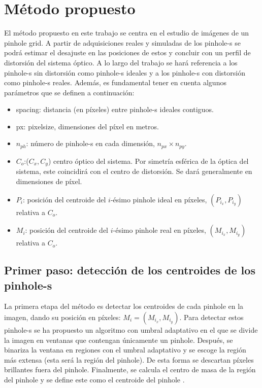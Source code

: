 \documentclass[12pt]{article}
\numberwithin{equation}{section}%
\newcommand{\lightit}[1]{{\lightitfont #1}}
\begin{document}
\section{Método propuesto}
\label{sec:Metodo}
El método propuesto en este trabajo se centra en el estudio de imágenes de un \lightit{pinhole grid}. A partir de adquisiciones reales y simuladas de los \lightit{pinhole}-s se podrá estimar el desajuste en las posiciones de estos y concluir con un perfil de distorsión del sistema óptico. A lo largo del trabajo se hará referencia a los \lightit{pinhole}-s sin distorsión como \lightit{pinhole}-s ideales y a los \lightit{pinhole}-s con distorsión como \lightit{pinhole}-s reales. Además, es fundamental tener en cuenta algunos parámetros que se definen a continuación:
\begin{itemize}
    \item \lightit{spacing}: distancia (en píxeles) entre \lightit{pinhole}-s ideales contiguos.
    \item \lightit{px}: pixelsize, dimensiones del píxel en metros.
    \item $n_{ph}$: número de \lightit{pinhole}-s en cada dimensión, \(n_{px} \times n_{py}\).
    \item $C_{o}$:(\(C_x, C_y\)) centro óptico del sistema. Por simetría esférica de la óptica del sistema, este 
    coincidirá con el centro de distorsión. Se dará generalmente en dimensiones de píxel.
    \item $P_i$: posición del centroide del \(i\)-ésimo \lightit{pinhole} ideal en píxeles, \((P_{i_x}, P_{i_y})\) relativa a \(C_o\).
    \item $M_i$: posición del centroide del \(i\)-ésimo \lightit{pinhole} real en píxeles, \((M_{i_x}, M_{i_y})\) relativa a \(C_o\).
\end{itemize}

\subsection{Primer paso: detección de los centroides de los \lightit{pinhole}-s}

La primera etapa del método es detectar los centroides de cada \lightit{pinhole} en la imagen, dando su posición en píxeles: \(M_i=(M_{i_x}, M_{i_y})\). Para detectar estos \lightit{pinhole}-s se ha propuesto un algoritmo con umbral adaptativo en el que se divide la imagen en ventanas que contengan únicamente un \lightit{pinhole}. Después, se binariza la ventana en regiones con el umbral adaptativo y se escoge la región más extensa (esta será la región del \lightit{pinhole}). De esta forma se descartan píxeles brillantes fuera del \lightit{pinhole}. Finalmente, se calcula el centro de masa de la región del \lightit{pinhole} y se define este como el centroide del \lightit{pinhole} \cite{Yin2010Centroid}.\\
\end{document}
